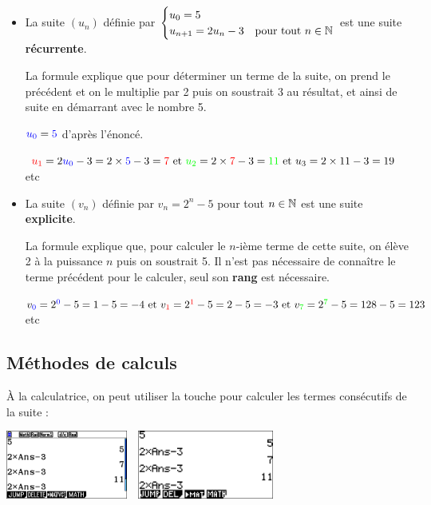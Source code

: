 \documentclass[a4paper,11pt]{article}
\begin{document}
\begin{cexemple}[s]
\begin{itemize}[leftmargin=*]
	\item La suite $(u_n)$ définie par $\begin{cases}u_0=5& \\u_{n+1}=2u_n-3& \mbox{pour tout } n\in\N 		\end{cases}$ est une suite \textbf{récurrente}.
	
	La formule explique que pour déterminer un terme de la suite, on prend le précédent et on le multiplie par 2 puis on soustrait 3 au résultat, et ainsi de suite en démarrant avec le nombre 5.
	
	$\textcolor{blue}{u_0}=\textcolor{blue}{5}$ d'après l'énoncé.
	
	$\textcolor{red}{u_1}=2\textcolor{blue}{u_0}-3=2\times\textcolor{blue}{5} -3=\textcolor{red}{7} \text{ et } \textcolor{green}{u_2}=2\times \textcolor{red}{7}-3=\textcolor{green}{11} \text{ et } u_3=2\times11-3=19$ etc
	\item La suite $(v_n)$ définie par $v_n=2^n-5 $ pour tout $n \in \N$ est une suite \textbf{explicite}.
	
	La formule explique que, pour calculer le $n$-ième terme de cette suite, on élève 2 à la puissance $n$ puis on soustrait 5. Il n'est pas nécessaire de connaître le terme précédent pour le calculer, seul son \textbf{rang} est nécessaire.
	
	$v_{\textcolor{blue}{0}}=2^{\textcolor{blue}{0}}-5=1-5=-4 \text{ et } v_{\textcolor{red}{1}}=2^{\textcolor{red}{1}}-5=2-5=-3 \text{ et } v_{\textcolor{green}{7}}=2^{\textcolor{green}{7}}-5=128-5=123$ etc
\end{itemize}
\end{cexemple}

\subsection{Méthodes de calculs}

\begin{ccalco}
À la calculatrice, on peut utiliser la touche  pour calculer les termes consécutifs de la suite :
\begin{center}
	\includegraphics[height=2.25cm]{chap02_suites_ans_90}~~\includegraphics[height=2.25cm]{chap02_suites_ans_35}
\end{center}
\end{ccalco}
\end{document}
